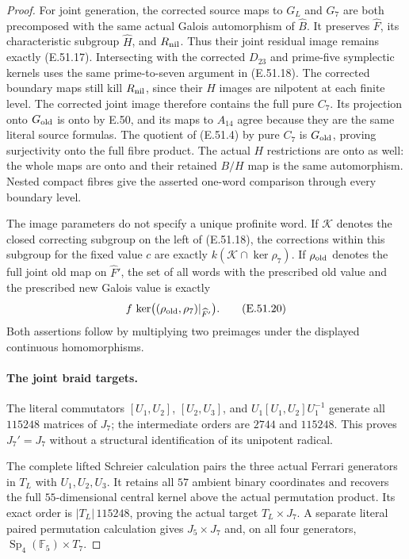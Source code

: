 \begin{proof}
For joint generation, the corrected source maps
to $G_L$ and $G_7$ are both precomposed with the
same actual Galois automorphism of $\widehat B$.
It preserves $\widehat F$, its characteristic
subgroup $\widehat H$, and $R_{\rm nil}$.
Thus their joint residual image remains exactly
\textup{(E.51.17)}.  Intersecting with the corrected
$D_{23}$ and prime-five symplectic kernels uses
the same prime-to-seven argument in
\textup{(E.51.18)}.  The corrected boundary maps
still kill $R_{\rm nil}$, since their $H$ images
are nilpotent at each finite level.  The corrected
joint image therefore contains the full pure
$C_7$.  Its projection onto $G_{\rm old}$ is onto
by E.50, and its maps to $A_{14}$ agree because
they are the same literal source formulas.
The quotient of \textup{(E.51.4)} by pure $C_7$
is $G_{\rm old}$, proving surjectivity onto the
full fibre product.  The actual $H$ restrictions
are onto as well: the whole maps are onto and
their retained $B/H$ map is the same automorphism.
Nested compact fibres give the asserted one-word
comparison through every boundary level.

The image parameters do not specify a unique
profinite word.  If $\mathcal K$ denotes the closed
correcting subgroup on the left of
\textup{(E.51.18)}, the corrections within this subgroup
for the fixed value $c$ are exactly
$k(\mathcal K\cap\ker\rho_7)$.  If $\rho_{\rm old}$
denotes the full joint old map on $\widehat F'$, the
set of all words with the prescribed old value and
the prescribed new Galois value is exactly
\[
       f\,\ker\bigl((\rho_{\rm old},\rho_7)
                                      |_{\widehat F'}\bigr).
\tag{E.51.20}
\]
Both assertions follow by multiplying two preimages
under the displayed continuous homomorphisms.

\paragraph{The joint braid targets.}
The literal commutators $[U_1,U_2]$,
$[U_2,U_3]$, and $U_1[U_1,U_2]U_1^{-1}$ generate
all $115248$ matrices of $J_7$; the intermediate
orders are $2744$ and $115248$.  This proves
$J_7'=J_7$ without a structural identification
of its unipotent radical.

The complete lifted Schreier calculation pairs
the three actual Ferrari generators in $T_L$
with $U_1,U_2,U_3$.  It retains all $57$ ambient
binary coordinates and recovers the full
$55$-dimensional central kernel above the
actual permutation product.  Its exact order
is $|T_L|\,115248$, proving the actual target
$T_L\times J_7$.  A separate literal paired
permutation calculation gives $J_5\times J_7$
and, on all four generators,
$\operatorname{Sp}_4(\mathbb F_5)\times T_7$.


\end{proof}
